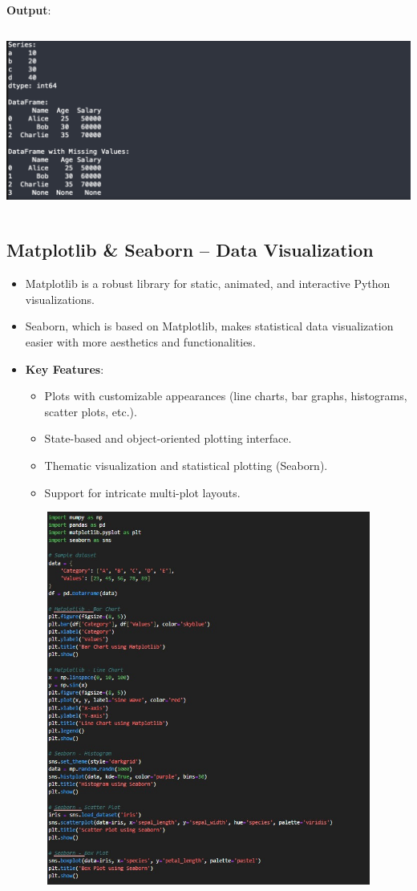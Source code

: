 \documentclass{article}
\begin{document}
\textbf{Output}:

\includegraphics[width=14
cm,height=6cm]{Pandas_Output.png}
\subsection{Matplotlib \& Seaborn – Data Visualization}
\begin{itemize}
    \item Matplotlib is a robust library for static, animated, and interactive Python visualizations.
    \item Seaborn, which is based on Matplotlib, makes statistical data visualization easier with more aesthetics and functionalities.
\item \textbf{Key Features}:
    \begin{itemize}
    \item Plots with customizable appearances (line charts, bar graphs, histograms, scatter plots, etc.).
    \item State-based and object-oriented plotting interface.
    \item Thematic visualization and statistical plotting (Seaborn).
    \item Support for intricate multi-plot layouts.
    \end{itemize}
\end{itemize}
\includegraphics[width=14cm,height=12.3cm]{Matplotlib.jpeg}
\end{document}
